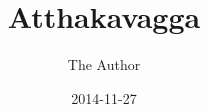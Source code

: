 \documentclass[
  final,
  pagePreset=tallpage,
  babelLanguage=slovene,
]{anecdote}
\title{Atthakavagga}
\subtitle{}
\author{The Author}
\date{2014-11-27}
\begin{document}
\frontmatter

\cleartorecto
\tableofcontents*

%



\mainmatter







%

\backmatter

%


\end{document}
